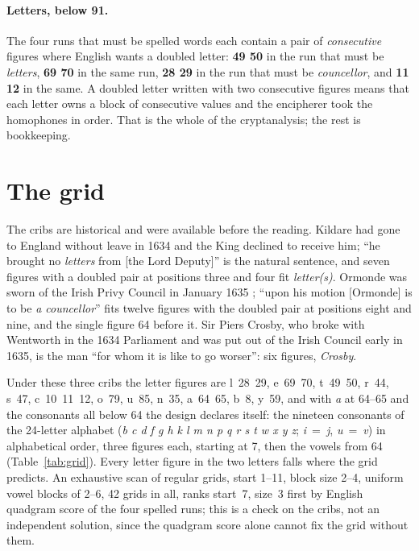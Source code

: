 \documentclass[11pt]{article}
\begin{document}
\paragraph{Letters, below 91.} The four runs that must be spelled words each contain a pair of \emph{consecutive} figures where English wants a doubled letter: \textbf{49 50} in the run that must be \emph{letters}, \textbf{69 70} in the same run, \textbf{28 29} in the run that must be \emph{councellor}, and \textbf{11 12} in the same. A doubled letter written with two consecutive figures means that each letter owns a block of consecutive values and the encipherer took the homophones in order. That is the whole of the cryptanalysis; the rest is bookkeeping.

\section{The grid}

The cribs are historical and were available before the reading. Kildare had gone to England without leave in 1634 and the King declined to receive him; ``he brought no \emph{letters} from [the Lord Deputy]'' is the natural sentence, and seven figures with a doubled pair at positions three and four fit \emph{letter(s)}. Ormonde was sworn of the Irish Privy Council in January 1635 \cite{Wedgwood:1961}; ``upon his motion [Ormonde] is to be \emph{a councellor}'' fits twelve figures with the doubled pair at positions eight and nine, and the single figure 64 before it. Sir Piers Crosby, who broke with Wentworth in the 1634 Parliament and was put out of the Irish Council early in 1635, is the man ``for whom it is like to go worser'': six figures, \emph{Crosby}.

Under these three cribs the letter figures are l~28~29, e~69~70, t~49~50, r~44, s~47, c~10~11~12, o~79, u~85, n~35, a~64~65, b~8, y~59, and with \emph{a} at 64--65 and the consonants all below 64 the design declares itself: the nineteen consonants of the 24-letter alphabet (\emph{b c d f g h k l m n p q r s t w x y z}; \emph{i}~=~\emph{j}, \emph{u}~=~\emph{v}) in alphabetical order, three figures each, starting at 7, then the vowels from 64 (Table~\ref{tab:grid}). Every letter figure in the two letters falls where the grid predicts. An exhaustive scan of regular grids, start 1--11, block size 2--4, uniform vowel blocks of 2--6, 42 grids in all, ranks start~7, size~3 first by English quadgram score of the four spelled runs; this is a check on the cribs, not an independent solution, since the quadgram score alone cannot fix the grid without them.
\end{document}
